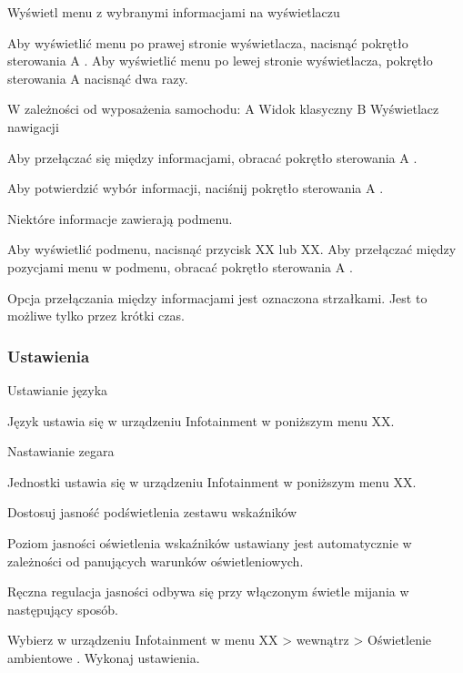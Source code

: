Wyświetl menu z wybranymi informacjami na wyświetlaczu
\begin{itemizeArrow}
	\itemArrow Aby wyświetlić menu po prawej stronie wyświetlacza, nacisnąć pokrętło sterowania A .
	\itemArrow Aby wyświetlić menu po lewej stronie wyświetlacza, pokrętło sterowania A nacisnąć dwa razy.
\end{itemizeArrow}
W zależności od wyposażenia samochodu:
A Widok klasyczny
B Wyświetlacz nawigacji
\begin{itemizeArrow}
	\itemArrow Aby przełączać się między informacjami, obracać pokrętło sterowania A .
\end{itemizeArrow}

\begin{itemizeArrow}
	\itemArrow Aby potwierdzić wybór informacji, naciśnij pokrętło sterowania A .
\end{itemizeArrow}

Niektóre informacje zawierają podmenu.
\begin{itemizeArrow}
	\itemArrow Aby wyświetlić podmenu, nacisnąć przycisk XX lub XX.
	\itemArrow Aby przełączać między pozycjami menu w podmenu, obracać pokrętło sterowania A .
\end{itemizeArrow}

Opcja przełączania między informacjami jest oznaczona strzałkami. Jest to możliwe tylko przez krótki czas.

\subsubsection{Ustawienia}

Ustawianie języka

Język ustawia się w urządzeniu Infotainment w poniższym menu XX.

Nastawianie zegara

Jednostki ustawia się w urządzeniu Infotainment w poniższym menu XX.


Dostosuj jasność podświetlenia zestawu wskaźników

Poziom jasności oświetlenia wskaźników ustawiany jest automatycznie w zależności od panujących warunków oświetleniowych.

Ręczna regulacja jasności odbywa się przy włączonym świetle mijania w następujący sposób.

\begin{itemizeArrow}
	\itemArrow Wybierz w urządzeniu Infotainment w menu XX > wewnątrz > Oświetlenie ambientowe .
	\itemArrow Wykonaj ustawienia.
\end{itemizeArrow}

